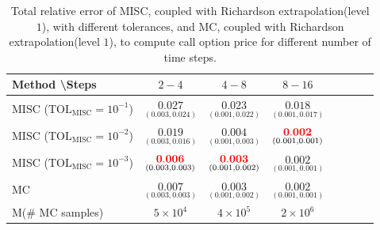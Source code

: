 \FloatBarrier
\begin{table}[h!]
	\centering
	\begin{tabular}{l*{6}{c}r}
		Method \textbackslash  Steps           & $2-4$ & $4-8$ & $8-16$  \\
		\hline

		MISC ($\text{TOL}_{\text{MISC}}=10^{-1}$)  &$\underset{(0.003,0.024)}{\mathbf{0.027}}$  &$\underset{(0.001,0.022)}{\mathbf{0.023}}$ & $\underset{(0.001,0.017)} {\mathbf{0.018}}$  \\

			MISC ($\text{TOL}_{\text{MISC}}=10^{-2}$)  & $\underset{(0.003,0.016)}{\mathbf{0.019}}$  & $\underset{(0.001,0.003)}{\mathbf{0.004}}$ & $\underset{(0.001,0.001)} {{\color{red}\mathbf{0.002}}}$  \\
		MISC ($\text{TOL}_{\text{MISC}}=10^{-3}$)  & $\underset{(0.003,0.003)}{{\color{red}\mathbf{0.006}}}$  & $\underset{(0.001,0.002)}{{\color{red}\mathbf{0.003}}}$ & $\underset{(0.001,0.001)} {\mathbf{0.002}}$  \\
	
	\hline

		MC    & $\underset{(0.003,0.003)}{\mathbf{0.007}}$  &   $\underset{(0.001,0.002)}{\mathbf{0.003}}$  &  $\underset{(0.001,0.001)}{\mathbf{0.002}}$  \\
			M(\# MC samples) & $5 \times 10^4$  &   $4 \times 10^5$  &  $2 \times 10^6$  \\
		\hline
	\end{tabular}
	\caption{Total relative error of MISC, coupled with Richardson extrapolation(level $1$), with different tolerances, and MC, coupled with Richardson extrapolation(level $1$), to compute call option price  for different number of time steps.}
	\label{Total  error of MISC and MC to compute Call option price of the different tolerances for different number of time steps. Case set $3$ parameters, with Richardson extrapolation(level $1$). The numbers between parentheses are the corresponding absolute errors.}
\end{table}

\FloatBarrier

